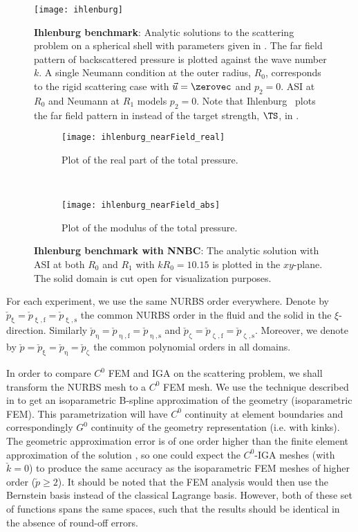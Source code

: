 \begin{figure}
	\centering
	\texttt{[image: ihlenburg]}
	\caption{\textbf{Ihlenburg benchmark}: Analytic solutions to the scattering problem on a spherical shell with parameters given in . The far field pattern of backscattered pressure is plotted against the wave number $k$. A single Neumann condition at the outer radius, $R_0$, corresponds to the rigid scattering case with $\vec{u}=\zerovec$ and $p_2=0$. ASI at $R_0$ and Neumann at $R_1$ models $p_2=0$. Note that Ihlenburg~\cite[p. 192]{Ihlenburg1998fea} plots the far field pattern in  instead of the target strength, $\TS$, in .}
	\label{Fig2:ihlenburgTSexact}
\end{figure}
\begin{figure}
	\centering
	\begin{subfigure}[t]{0.48\textwidth}
		\centering
		\texttt{[image: ihlenburg\_nearField\_real]}
		\caption{Plot of the real part of the total pressure.}
	\end{subfigure}
	~
	\begin{subfigure}[t]{0.48\textwidth}
		\centering
		\texttt{[image: ihlenburg\_nearField\_abs]}
		\caption{Plot of the modulus of the total pressure.}
	\end{subfigure}
	
	\caption{\textbf{Ihlenburg benchmark with NNBC}: The analytic solution with ASI at both $R_0$ and $R_1$ with $kR_0=10.15$ is plotted in the $xy$-plane. The solid domain is cut open for visualization purposes.}
	\label{Fig2:ihlenburg3Dexact}
\end{figure}
For each experiment, we use the same NURBS order everywhere. Denote by $\check{p}_\upxi = \check{p}_{\upxi,\mathrm{f}} = \check{p}_{\upxi,\mathrm{s}}$ the common NURBS order in the fluid and the solid in the $\xi$-direction. Similarly $\check{p}_\upeta = \check{p}_{\upeta,\mathrm{f}} = \check{p}_{\upeta,\mathrm{s}}$ and $\check{p}_\upzeta = \check{p}_{\upzeta,\mathrm{f}} = \check{p}_{\upzeta,\mathrm{s}}$. Moreover, we denote by $\check{p} = \check{p}_\upxi = \check{p}_\upeta = \check{p}_\upzeta$ the common polynomial orders in all domains.

In order to compare $C^0$ FEM and IGA on the scattering problem, we shall transform the NURBS mesh to a $C^0$ FEM mesh. We use the technique described in  to get an isoparametric B-spline approximation of the geometry (isoparametric FEM). This parametrization will have $C^0$ continuity at element boundaries and correspondingly $G^0$ continuity of the geometry representation (i.e. with kinks). The geometric approximation error is of one order higher than the finite element approximation of the solution \cite{Strang1973aao}, so one could expect the $C^0$-IGA meshes (with $\check{k}=0$) to produce the same accuracy as the isoparametric FEM meshes of higher order ($\check{p}\geq 2$). It should be noted that the FEM analysis would then use the Bernstein basis instead of the classical Lagrange basis. However, both of these set of functions spans the same spaces, such that the results should be identical in the absence of round-off errors. 

